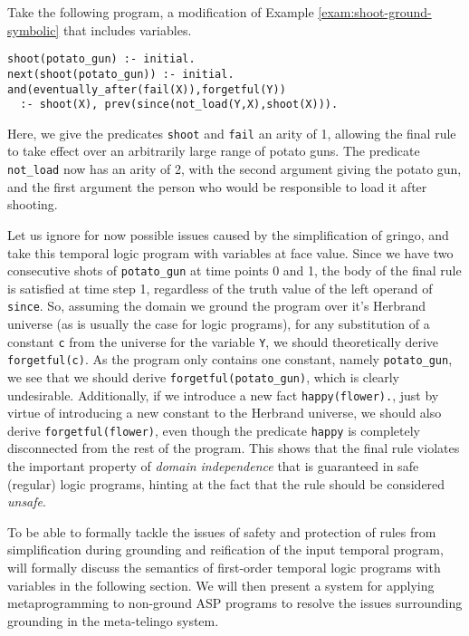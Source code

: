 \begin{example}\label{exam:shoot-nonground-unsafe}
  Take the following program, a modification of Example
  \ref{exam:shoot-ground-symbolic} that includes variables.
\begin{lstlisting}[language=clingo,numbers=none]
shoot(potato_gun) :- initial.
next(shoot(potato_gun)) :- initial.
and(eventually_after(fail(X)),forgetful(Y)) 
  :- shoot(X), prev(since(not_load(Y,X),shoot(X))).
\end{lstlisting}

Here, we give the predicates \verb|shoot| and \verb|fail| an arity of
1, allowing the final rule to take effect over an arbitrarily large
range of potato guns. The predicate \verb|not_load| now has an arity
of 2, with the second argument giving the potato gun, and the first
argument the person who would be responsible to load it after
shooting. 

Let us ignore for now possible issues caused by the simplification of
gringo, and take this temporal logic program with variables at face
value. Since we have two consecutive shots of \verb|potato_gun| at
time points 0 and 1, the body of the final rule is satisfied at time
step 1, regardless of the truth value of the left operand of
\verb|since|. So, assuming the domain we ground the program over it's
Herbrand universe (as is usually the case for logic programs), for any
substitution of a constant \verb|c| from the universe for the variable
\verb|Y|, we should theoretically derive \verb|forgetful(c)|. As the
program only contains one constant, namely \verb|potato_gun|, we see
that we should derive \verb|forgetful(potato_gun)|, which is clearly
undesirable. Additionally, if we introduce a new fact
\verb|happy(flower).|, just by virtue of introducing a new constant to
the Herbrand universe, we should also derive \verb|forgetful(flower)|,
even though the predicate \verb|happy| is completely disconnected from
the rest of the program. This shows that the final rule violates the
important property of \textit{domain independence} that is guaranteed
in safe (regular) logic programs, hinting at the fact that the rule
should be considered \textit{unsafe}.
\end{example}

To be able to formally tackle the issues of safety and protection of
rules from simplification during grounding and reification of the
input temporal program, will formally discuss the semantics of
first-order temporal logic programs with variables in the following
section. We will then present a system for applying metaprogramming to
non-ground ASP programs to resolve the issues surrounding grounding in
the meta-telingo system.
